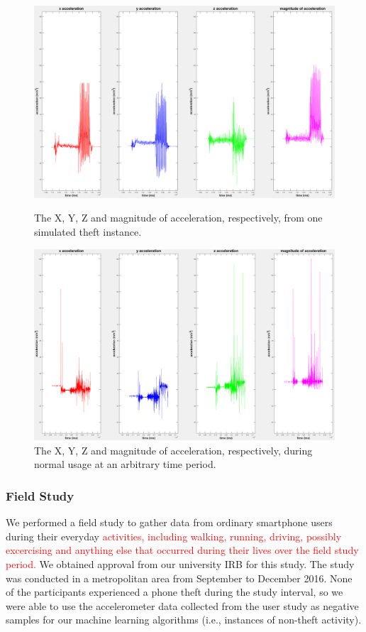 \begin{figure}[t]
\includegraphics[width=1.0\columnwidth]{pos_acc_separated.png}
\caption{The X, Y, Z and magnitude of acceleration, respectively, from one simulated theft instance.}
\label{fig:simtheft}
\includegraphics[width=1.0\columnwidth]{neg_acc_separated.png}
\caption{The X, Y, Z and magnitude of acceleration, respectively, during normal usage at an arbitrary time period.}
\end{figure}




\subsubsection{Field Study}
We performed a field study to gather data from ordinary smartphone users
during their everyday \textcolor{red}{activities, including walking, running, driving, possibly excercising and anything else that occurred during their lives over the field study period.}
We obtained approval from our university IRB for this study. 
The study was conducted in a metropolitan area from September to December 2016.
None of the participants experienced a phone theft during the study interval,
so we were able to use the accelerometer data collected from the user study as negative samples for our machine learning algorithms (i.e., instances of non-theft activity).

